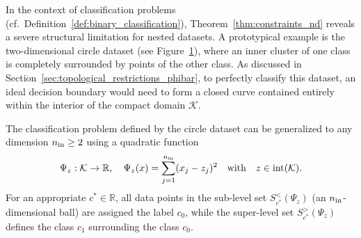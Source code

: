 \documentclass[10pt]{article}
\theoremstyle{definition}
\numberwithin{equation}{section}
\newcommand{\R}{\mathbb{R}}
\newcommand*{\nin}{n_\textup{in}}
\begin{document}
\begin{figure}
\begin{minipage}[t]{0.45\textwidth}
\begin{tikzpicture}[
		lbl/.style={font=\normalsize},
		ptr/.style={->, thin, black, >=stealth}
		]
	\end{tikzpicture}
    \label{fig:circledataset}
\end{minipage}
\hspace{2mm}
\end{figure}


In the context of classification problems (cf.~Definition~\ref{def:binary_classification}), Theorem~\ref{thm:constraints_nd} reveals a severe structural limitation for nested datasets. A prototypical example is the two-dimensional circle dataset (see Figure~\ref{fig:circledataset}), where an inner cluster of one class is completely surrounded by points of the other class. As discussed in Section~\ref{sec:topological_restrictions_phibar}, to perfectly classify this dataset, an ideal decision boundary would need to form a closed curve contained entirely within the interior of the compact domain $\mathcal{K}$. 

The classification problem defined by the circle dataset can be generalized to any dimension $n_{\textup{in}} \geq 2$ using a quadratic function
\begin{equation*}
    \Psi_z: \mathcal{K} \rightarrow \R, \quad \Psi_z(x) = \sum_{j = 1}^{\nin}(x_j-z_j)^2 \quad \text{with} \quad z\in \textup{int}(\mathcal{K}).
\end{equation*}
For an appropriate $c^\ast \in \R$, all data points in the sub-level set $S_{c^\ast}^{<}(\Psi_z)$ (an $\nin$-dimensional ball) are assigned the label $c_0$, while the super-level set $S_{c^\ast}^{>}(\Psi_z)$ defines the class $c_1$ surrounding the class $c_0$.
\end{document}
